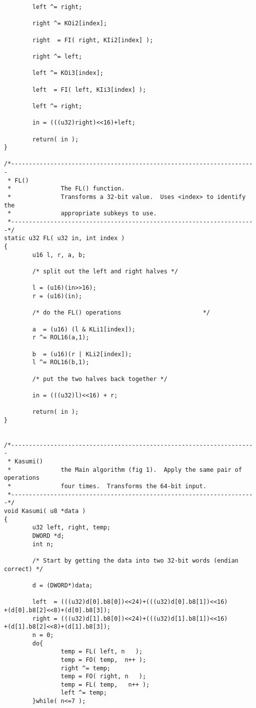 \begin{verbatim}
        left ^= right;

        right ^= KOi2[index];

        right  = FI( right, KIi2[index] );

        right ^= left;

        left ^= KOi3[index];

        left  = FI( left, KIi3[index] );

        left ^= right;

        in = (((u32)right)<<16)+left;

        return( in );
}

/*---------------------------------------------------------------------
 * FL()
 *              The FL() function.
 *              Transforms a 32-bit value.  Uses <index> to identify the
 *              appropriate subkeys to use.
 *---------------------------------------------------------------------*/
static u32 FL( u32 in, int index )
{
        u16 l, r, a, b;

        /* split out the left and right halves */

        l = (u16)(in>>16);
        r = (u16)(in);

        /* do the FL() operations                       */

        a  = (u16) (l & KLi1[index]);
        r ^= ROL16(a,1);

        b  = (u16)(r | KLi2[index]);
        l ^= ROL16(b,1);

        /* put the two halves back together */

        in = (((u32)l)<<16) + r;

        return( in );
}


/*---------------------------------------------------------------------
 * Kasumi()
 *              the Main algorithm (fig 1).  Apply the same pair of operations
 *              four times.  Transforms the 64-bit input.
 *---------------------------------------------------------------------*/
void Kasumi( u8 *data )
{
        u32 left, right, temp;
        DWORD *d;
        int n;

        /* Start by getting the data into two 32-bit words (endian correct) */

        d = (DWORD*)data;

        left  = (((u32)d[0].b8[0])<<24)+(((u32)d[0].b8[1])<<16)
+(d[0].b8[2]<<8)+(d[0].b8[3]);
        right = (((u32)d[1].b8[0])<<24)+(((u32)d[1].b8[1])<<16)
+(d[1].b8[2]<<8)+(d[1].b8[3]);
        n = 0;
        do{
                temp = FL( left, n   );
                temp = FO( temp,  n++ );
                right ^= temp;
                temp = FO( right, n   );
                temp = FL( temp,   n++ );
                left ^= temp;
        }while( n<=7 );


\end{verbatim}
